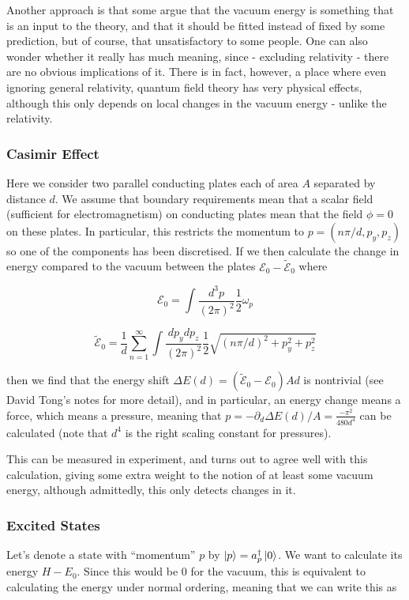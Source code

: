 \documentclass{article}
\theoremstyle{definition}
\begin{document}
Another approach is that some argue that the vacuum energy is something that is
an input to the theory, and that it should be fitted instead of fixed by some
prediction, but of course, that unsatisfactory to some people. One can also
wonder whether it really has much meaning, since - excluding relativity - there
are no obvious implications of it. There is in fact, however, a place where even
ignoring general relativity, quantum field theory has very physical effects,
although this only depends on local changes in the vacuum energy - unlike the
relativity. 

\subsubsection{Casimir Effect}

Here we consider two parallel conducting plates each of area $A$ separated by
distance $d$. We assume that boundary requirements mean that a scalar field
(sufficient for electromagnetism) on conducting plates mean that the field $\phi
= 0$ on these plates. In particular, this restricts the momentum to $p = (n\pi /
d, p_y, p_z)$ so one of the components has been discretised. If we then
calculate the change in energy compared to the vacuum between the plates
$\mathcal{E}_0 - \tilde{\mathcal{E}}_0$ where

$$ \mathcal{E}_0 = \int \frac{d^3p}{(2\pi)^2} \frac{1}{2} \omega_p $$

$$ \tilde{\mathcal{E}}_0 = \frac{1}{d} \sum_{n = 1}^\infty \int \frac{dp_y
  dp_z}{(2\pi)^2} \frac{1}{2} \sqrt{(n\pi / d)^2 + p_y^2 + p_z^2} $$

then we find that the energy shift $\Delta E(d) = (\tilde{\mathcal{E}}_0 -
\mathcal{E}_0) A d$ is nontrivial (see David Tong's notes for more detail), and
in particular, an energy change means a force, which means a pressure, meaning
that $p = - \partial_d \Delta E(d) / A = \frac{-\pi^2}{480 d^4}$ can be
calculated (note that $d^4$ is the right scaling constant for pressures).

This can be measured in experiment, and turns out to agree well with this
calculation, giving some extra weight to the notion of at least some vacuum
energy, although admittedly, this only detects changes in it.

\subsubsection{Excited States}

Let's denote a state with ``momentum'' $p$ by $\ket{p} = a_p^\dagger \ket{0}$.
We want to calculate its energy $H - E_0$. Since this would be 0 for the vacuum,
this is equivalent to calculating the energy under normal ordering, meaning that
we can write this as
\end{document}
